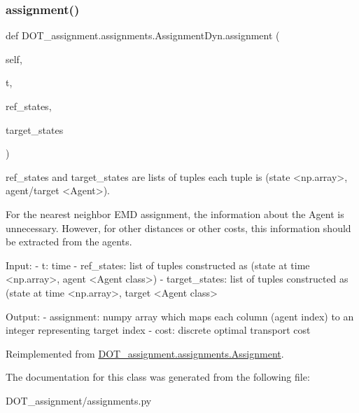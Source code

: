 \subsubsection{\texorpdfstring{assignment()}{assignment()}}
{\footnotesize\ttfamily def D\+O\+T\+\_\+assignment.\+assignments.\+Assignment\+Dyn.\+assignment (\begin{DoxyParamCaption}\item[{}]{self,  }\item[{}]{t,  }\item[{}]{ref\+\_\+states,  }\item[{}]{target\+\_\+states }\end{DoxyParamCaption})}

\begin{DoxyVerb}ref_states and target_states are lists of tuples
each tuple is (state <np.array>, agent/target <Agent>).

For the nearest neighbor EMD assignment, the information
about the Agent is unnecessary. However, for other distances
or other costs, this information should be extracted
from the agents.

Input:
- t:                    time
- ref_states:           list of tuples constructed as (state at time <np.array>, agent <Agent class>)
- target_states:        list of tuples constructed as (state at time <np.array>, target <Agent class>

Output:
- assignment:           numpy array which maps each column (agent index) to an integer representing target index
- cost:                 discrete optimal transport cost\end{DoxyVerb}
 

Reimplemented from \mbox{\hyperlink{class_d_o_t__assignment_1_1assignments_1_1_assignment}{D\+O\+T\+\_\+assignment.\+assignments.\+Assignment}}.



The documentation for this class was generated from the following file\+:\begin{DoxyCompactItemize}
\item 
D\+O\+T\+\_\+assignment/assignments.\+py\end{DoxyCompactItemize}
